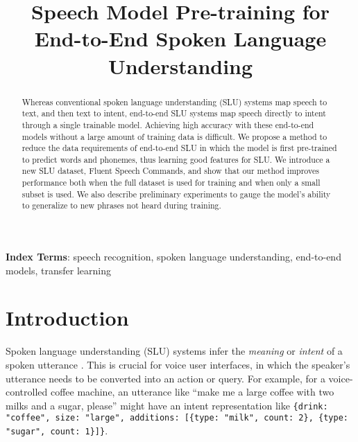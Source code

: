 \documentclass[a4paper]{article}
\title{Speech Model Pre-training for End-to-End Spoken Language Understanding}
\begin{document}
\maketitle
\begin{abstract}
Whereas conventional spoken language understanding (SLU) systems map speech to text, and then text to intent, end-to-end SLU systems map speech directly to intent through a single trainable model. Achieving high accuracy with these end-to-end models without a large amount of training data is difficult. We propose a method to reduce the data requirements of end-to-end SLU in which the model is first pre-trained to predict words and phonemes, thus learning good features for SLU. We introduce a new SLU dataset, Fluent Speech Commands, and show that our method improves performance both when the full dataset is used for training and when only a small subset is used. We also describe preliminary experiments to gauge the model's ability to generalize to new phrases not heard during training.

\end{abstract}
\noindent\textbf{Index Terms}: speech recognition, spoken language understanding, end-to-end models, transfer learning

\section{Introduction}
Spoken language understanding (SLU) systems infer the \textit{meaning} or \textit{intent} of a spoken utterance \cite{renato_SLU}.
This is crucial for voice user interfaces, in which the speaker's utterance needs to be converted into an action or query. 
For example, for a voice-controlled coffee machine, an utterance like ``make me a large coffee with two milks and a sugar, please'' might have an intent representation like \texttt{\{drink: "coffee", size: "large", additions: 
[\{type: "milk", count: 2\}, \{type: "sugar", count: 1\}]\}}.
\end{document}
